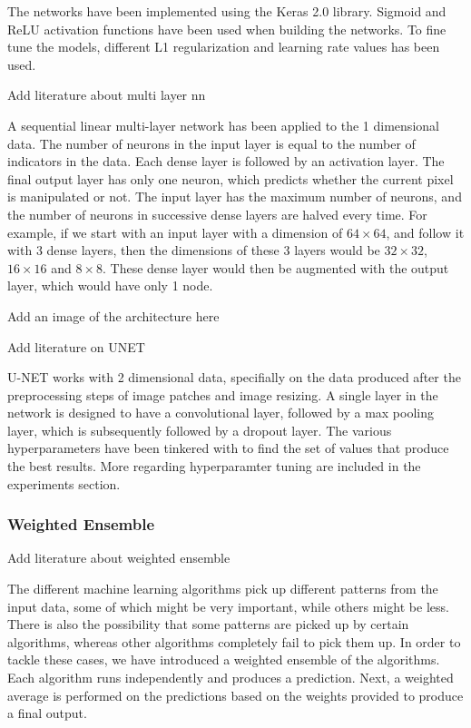 The networks have been implemented using the Keras 2.0 library. Sigmoid and ReLU activation functions have been used when building the networks. 
To fine tune the models, different L1 regularization and learning rate values has been used.


Add literature about multi layer nn


A sequential linear multi-layer network has been applied to the 1 dimensional data. The number of neurons in the input layer is equal to the number of 
indicators in the data. Each dense layer is followed by an activation layer. The final output layer has only one neuron, which predicts whether the current
pixel is manipulated or not. The input layer has the maximum number of neurons, and the number of neurons in successive dense layers are halved every time. 
For example, if we start with an input layer with a dimension of $64\times64$, and follow it with 3 dense layers, then the dimensions of these 3 layers would be 
$32\times32$, $16\times16$ and $8\times8$. These dense layer would then be augmented with the output layer, which would have only 1 node.

Add an image of the architecture here



Add literature on UNET

U-NET works with 2 dimensional data, specifially on the data produced after the preprocessing steps of image patches 
and image resizing. A single layer in the network is designed to have a convolutional layer, followed by a max pooling layer, which is subsequently 
followed by a dropout layer. The various hyperparameters have been tinkered with to find the set of values that produce the best results. More regarding 
hyperparamter tuning are included in the experiments section.


\subsubsection{Weighted Ensemble}

Add literature about weighted ensemble

The different machine learning algorithms pick up different patterns from the input data, some of which might be very important, while others might be 
less. There is also the possibility that some patterns are picked up by certain algorithms, whereas other algorithms completely fail to pick them up.
In order to tackle these cases, we have introduced a weighted ensemble of the algorithms. Each algorithm runs independently and produces a prediction.
Next, a weighted average is performed on the predictions based on the weights provided to produce a final output.

